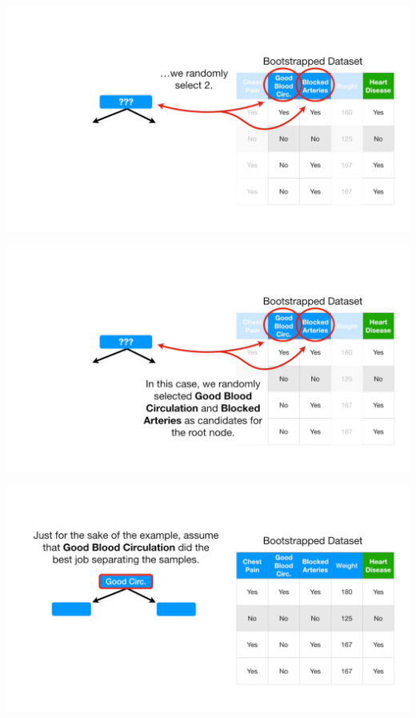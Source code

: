 \documentclass[
  ignorenonframetext,
]{beamer}
\begin{document}
\begin{frame}{}
\protect\hypertarget{section-26}{}
\includegraphics{images/r27.png}
\end{frame}

\begin{frame}{}
\protect\hypertarget{section-27}{}
\includegraphics{images/r28.png}
\end{frame}

\begin{frame}{}
\protect\hypertarget{section-28}{}
\includegraphics{images/r29.png}
\end{frame}
\end{document}
